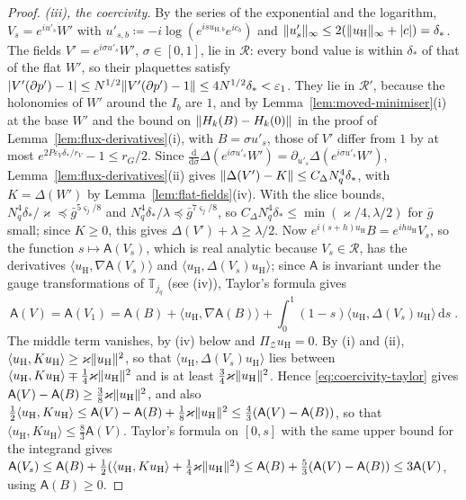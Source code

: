 \documentclass[11pt]{preprint}
\newcommand{\dd}{\mathrm{d}}
\DeclarePairedDelimiter{\abs}{\lvert}{\rvert}
\DeclarePairedDelimiter{\norm}{\lVert}{\rVert}
\numberwithin{equation}{section}
\theoremstyle{definition}
\theoremstyle{remark}
\theoremstyle{plain}
\begin{document}
\begin{proof}
\emph{(iii), the coercivity.} By the series of the exponential and the logarithm, $V_s = e^{iu'_s}W'$ with $u'_{s,b} \coloneqq -i\log(e^{isu_{\mathrm H,b}}e^{ic_b})$ and $\norm{u'_s}_\infty \leq 2(\norm{u_{\mathrm H}}_\infty + \abs c) = \delta_*$. The fields $V' = e^{i\sigma u'_s}W'$, $\sigma \in [0, 1]$, lie in $\mathcal R$: every bond value is within $\delta_*$ of that of the flat $W'$, so their plaquettes satisfy $\abs{V'(\partial p') - 1} \leq N^{1/2}\norm{V'(\partial p') - 1} \leq 4N^{1/2}\delta_* < \varepsilon_1$. They lie in $\mathcal R'$, because the holonomies of $W'$ around the $I_b$ are $1$, and by Lemma~\ref{lem:moved-minimiser}(i) at the base $W'$ and the bound on $\norm{H_k(B) - H_k(0)}$ in the proof of Lemma~\ref{lem:flux-derivatives}(i), with $B = \sigma u'_s$, those of $V'$ differ from $1$ by at most $e^{2P\varepsilon_V\delta_*/r_V} - 1 \leq r_G/2$. Since $\frac{\dd}{\dd\sigma}\Delta(e^{i\sigma u'_s}W') = \partial_{u'_s}\Delta(e^{i\sigma u'_s}W')$, Lemma~\ref{lem:flux-derivatives}(ii) gives $\norm{\Delta(V') - K} \leq C_\Delta N_q^4\delta_*$, with $K = \Delta(W')$ by Lemma~\ref{lem:flat-fields}(iv). With the slice bounds, $N_q^4\delta_*/\varkappa \preceq \bar g^{5\varsigma_j/8}$ and $N_q^4\delta_*/\lambda \preceq \bar g^{7\varsigma_j/8}$, so $C_\Delta N_q^4\delta_* \leq \min(\varkappa/4, \lambda/2)$ for $\bar g$ small; since $K \geq 0$, this gives $\Delta(V') + \lambda \geq \lambda/2$. Now $e^{i(s+h)u_{\mathrm H}}B = e^{ihu_{\mathrm H}}V_s$, so the function $s \mapsto \mathsf A(V_s)$, which is real analytic because $V_s \in \mathcal R$, has the derivatives $\langle u_{\mathrm H}, \nabla\mathsf A(V_s)\rangle$ and $\langle u_{\mathrm H}, \Delta(V_s)u_{\mathrm H}\rangle$; since $\mathsf A$ is invariant under the gauge transformations of $\mathbb T_{j_q}$ (see (iv)), Taylor's formula gives
\begin{equation}\label{eq:coercivity-taylor}
    \mathsf A(V) = \mathsf A(V_1) = \mathsf A(B) + \langle u_{\mathrm H}, \nabla\mathsf A(B)\rangle + \int_0^1(1 - s)\langle u_{\mathrm H}, \Delta(V_s)u_{\mathrm H}\rangle\,\dd s\;.
\end{equation}
The middle term vanishes, by (iv) below and $\Pi_{\mathcal Z}u_{\mathrm H} = 0$. By (i) and (ii), $\langle u_{\mathrm H}, Ku_{\mathrm H}\rangle \geq \varkappa\norm{u_{\mathrm H}}^2$, so that $\langle u_{\mathrm H}, \Delta(V_s)u_{\mathrm H}\rangle$ lies between $\langle u_{\mathrm H}, Ku_{\mathrm H}\rangle \mp \frac14\varkappa\norm{u_{\mathrm H}}^2$ and is at least $\frac34\varkappa\norm{u_{\mathrm H}}^2$. Hence \eqref{eq:coercivity-taylor} gives $\mathsf A(V) - \mathsf A(B) \geq \frac38\varkappa\norm{u_{\mathrm H}}^2$, and also $\frac12\langle u_{\mathrm H}, Ku_{\mathrm H}\rangle \leq \mathsf A(V) - \mathsf A(B) + \frac18\varkappa\norm{u_{\mathrm H}}^2 \leq \frac43(\mathsf A(V) - \mathsf A(B))$, so that $\langle u_{\mathrm H}, Ku_{\mathrm H}\rangle \leq \frac83\mathsf A(V)$. Taylor's formula on $[0, s]$ with the same upper bound for the integrand gives $\mathsf A(V_s) \leq \mathsf A(B) + \frac12(\langle u_{\mathrm H}, Ku_{\mathrm H}\rangle + \frac14\varkappa\norm{u_{\mathrm H}}^2) \leq \mathsf A(B) + \frac53(\mathsf A(V) - \mathsf A(B)) \leq 3\mathsf A(V)$, using $\mathsf A(B) \geq 0$.


\end{proof}
\end{document}

